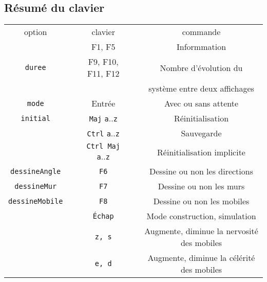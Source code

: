 \subsection{Résumé du clavier}
\begin{center}
\begin{tabular}{ccccc}
option & & clavier &  & commande \\
 &  & {\sf F1}, {\sf F5} &  & Informmation \\

\texttt{duree} &  & {\sf F9}, {\sf F10}, {\sf F11}, {\sf F12} &  & Nombre d'évolution du \\
 &  &  &  & système entre deux affichages \\
\texttt{mode} &  & {\sf Entrée} &  & Avec ou sans attente \\
%
\texttt{initial} &  & \texttt{Maj} \texttt{a}..\texttt{z} &  & Réinitialisation \\
 &  & \texttt{Ctrl} \texttt{a}..\texttt{z} &  & Sauvegarde \\
 &  & \texttt{Ctrl Maj} \texttt{a}..\texttt{z} &  & Réinitialisation implicite \\
\texttt{dessineAngle} &  & \texttt{F6} &  & Dessine ou non les directions \\
\texttt{dessineMur} &  & \texttt{F7} &  & Dessine ou non les murs \\
\texttt{dessineMobile} &  & \texttt{F8} &  & Dessine ou non les mobiles \\

 &  & \texttt{Échap} &  & Mode construction, simulation \\

 &  & \texttt{z, s} &  & Augmente, diminue la nervosité des mobiles \\
 &  & \texttt{e, d} &  & Augmente, diminue la célérité des mobiles \\


\end{tabular}
\end{center}
